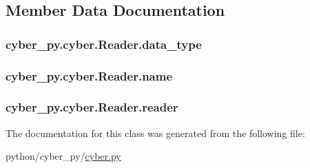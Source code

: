 \subsection{Member Data Documentation}
\hypertarget{classcyber__py_1_1cyber_1_1Reader_a74d08b0258abb362b1448b4d29f28577}{
\subsubsection[{data\-\_\-type}]{\setlength{\rightskip}{0pt plus 5cm}cyber\-\_\-py.\-cyber.\-Reader.\-data\-\_\-type}}\label{classcyber__py_1_1cyber_1_1Reader_a74d08b0258abb362b1448b4d29f28577}
\hypertarget{classcyber__py_1_1cyber_1_1Reader_a90bb93132165b6ad30246689544364f0}{
\subsubsection[{name}]{\setlength{\rightskip}{0pt plus 5cm}cyber\-\_\-py.\-cyber.\-Reader.\-name}}\label{classcyber__py_1_1cyber_1_1Reader_a90bb93132165b6ad30246689544364f0}
\hypertarget{classcyber__py_1_1cyber_1_1Reader_acef07a978cb31218464c83fccb690627}{
\subsubsection[{reader}]{\setlength{\rightskip}{0pt plus 5cm}cyber\-\_\-py.\-cyber.\-Reader.\-reader}}\label{classcyber__py_1_1cyber_1_1Reader_acef07a978cb31218464c83fccb690627}


The documentation for this class was generated from the following file\-:\begin{DoxyCompactItemize}
\item 
python/cyber\-\_\-py/\hyperlink{cyber_8py}{cyber.\-py}\end{DoxyCompactItemize}
